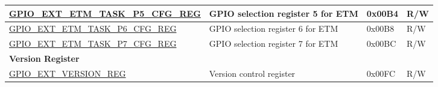 \begin{longtable}{ | p{6.2cm} | p{7.0cm} | p{1.3cm} | p{1cm} | }
\hyperref[regdesc:GPIOSDETMTASKP5CFGREG]{GPIO\_EXT\_ETM\_TASK\_P5\_CFG\_REG} & GPIO selection register 5 for ETM & 0x00B4 & R/W \\ \hline
\hyperref[regdesc:GPIOSDETMTASKP6CFGREG]{GPIO\_EXT\_ETM\_TASK\_P6\_CFG\_REG} & GPIO selection register 6 for ETM & 0x00B8 & R/W \\ \hline
\hyperref[regdesc:GPIOSDETMTASKP7CFGREG]{GPIO\_EXT\_ETM\_TASK\_P7\_CFG\_REG} & GPIO selection register 7 for ETM & 0x00BC & R/W \\ \hline
\multicolumn{4}{|l|}{\textbf{Version Register}} \\ \hline
\hyperref[regdesc:GPIOSDVERSIONREG]{GPIO\_EXT\_VERSION\_REG} & Version control register & 0x00FC & R/W \\ \hline
\end{longtable}

